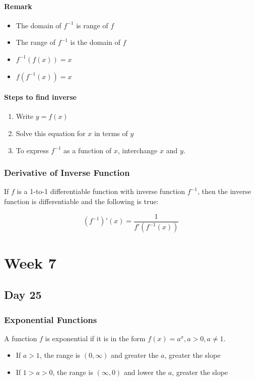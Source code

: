 \documentclass[12pt]{article}
\begin{document}
\paragraph{Remark} 
\begin{itemize}
    \item The domain of $f^{-1}$ is range of $f$
    \item The range of $f^{-1}$ is the domain of $f$
    \item $f^{-1}(f(x)) = x$
    \item $f(f^{-1}(x)) = x$
\end{itemize}


\paragraph{Steps to find inverse}
\begin{enumerate}
    \item Write $y=f(x)$
    \item Solve this equation for $x$ in terms of $y$
    \item To express $f^{-1}$ as a function of $x$, interchange $x$ and $y$.
\end{enumerate}

\subsubsection{Derivative of Inverse Function}\label{Derivative of Inverse Function}
If $f$ is a 1-to-1 differentiable function with inverse function $f^{-1}$, then the inverse function is differentiable and the following is true: 

$$(f^{-1})'(x) = \frac{1}{f'(f^{-1}(x))}$$




\section{Week 7}

\subsection{Day 25}

\subsubsection{Exponential Functions}
A function $f$ is  exponential if it is in the form $f(x)=a^x, a>0, a\neq 1$. 
\begin{itemize}
    \item If $a>1$, the range is $(0, \infty)$ and greater the $a$, greater the slope
    \item If $1>a>0$, the range is $(\infty, 0)$ and lower the $a$, greater the slope
\end{itemize}
\end{document}

